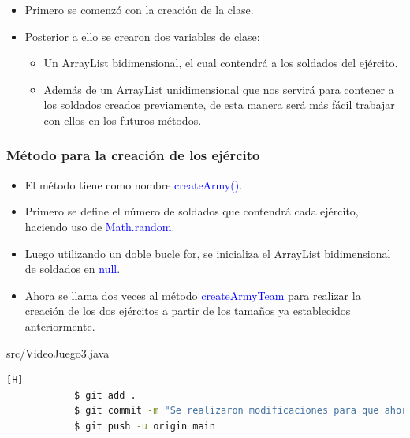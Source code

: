 \documentclass{article}
\begin{document}
        \begin{itemize}
            \item Primero se comenzó con la creación de la clase. 
            \item Posterior a ello se crearon dos variables de clase: 
            \begin{itemize}
                \item Un ArrayList bidimensional, el cual contendrá a los soldados del ejército.
                \item Además de un ArrayList unidimensional que nos servirá para contener a los soldados creados previamente, de esta manera será más fácil trabajar con ellos en los futuros métodos.
            \end{itemize}
        \end{itemize}

        
    
        \subsubsection{Método para la creación de los ejército}

        \begin{itemize}
            \item El método tiene como nombre \textcolor{blue}{createArmy()}.
            \item Primero se define el número de soldados que contendrá cada ejército, haciendo uso de \textcolor{blue}{Math.random}.
            \item Luego utilizando un doble bucle for, se inicializa el ArrayList bidimensional de soldados en \textcolor{blue}{null}.
            \item Ahora se llama dos veces al método \textcolor{blue}{createArmyTeam} para realizar la creación de los dos ejércitos a partir de los tamaños ya establecidos anteriormente.
        \end{itemize}

        
        {src/VideoJuego3.java}
        
        \begin{lstlisting}[language=bash,caption={Commit: Se implementó el método createArmy()}][H]
    		$ git add .
    		$ git commit -m "Se realizaron modificaciones para que ahora el programa trabaje con 2 ejercitos, se adapto el metodo createArmy con la ayuda de otro metodo que trabajara con cada ejercito llamado createArmyTeam"			
    		$ git push -u origin main
    	\end{lstlisting}
        
\end{document}
